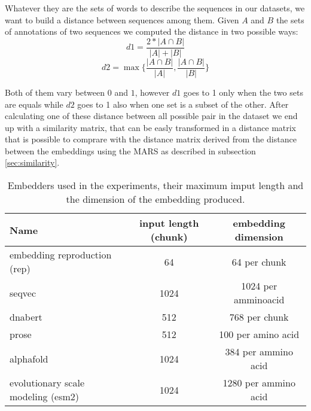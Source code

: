 \documentclass[12pt, letterpaper, twocolumn]{article}
\begin{document}
Whatever they are the sets of words to describe the sequences in our datasets, we want to build a distance between sequences among them. Given $A$ and $B$ the sets of annotations of two sequences we computed the distance in two possible ways: $$d1 = \frac{2 * |A \cap B|}{|A| + |B|} $$ $$d2 = \max\{ \frac{|A \cap B|}{|A|}, \frac{|A \cap B|}{|B|} \} $$

Both of them vary between $0$ and $1$, however $d1$ goes to 1 only when the two sets are equals while $d2$ goes to 1 also when one set is a subset of the other. After calculating one of these distance between all possible pair in the dataset we end up with a similarity matrix, that can be easly transformed in a distance matrix that is possible to comprare with the distance matrix derived from the distance between the embeddings using the MARS as described in subsection \ref{sec:similarity}.


\onecolumn
\begin{table}[htb]
\centering
\begin{tabular}{|l c c|} 
    \hline
    Name & input length (chunk) & embedding dimension  \\ 
    \hline
    embedding reproduction (rep)\cite{yang2018learned}       & 64    & 64 per chunk   \\
    seqvec \cite{heinzinger2019modeling} & 1024 & 1024 per amminoacid \\
    dnabert \cite{ji2021dnabert}                     & 512     & 768 per chunk \\
    prose   \cite{bepler2021learning}                   & 512   & 100 per amino acid   \\
    alphafold  \cite{jumper2021highly}                 & 1024   & 384 per ammino acid\\
    evolutionary scale modeling (esm2) \cite{lin2023evolutionary}   & 1024    & 1280 per ammino acid \\  
    \hline
\end{tabular}
\caption{Embedders used in the experiments, their maximum imput length and the dimension of the embedding produced.}
\label{tab:embedders}
\end{table}
\twocolumn
\end{document}
